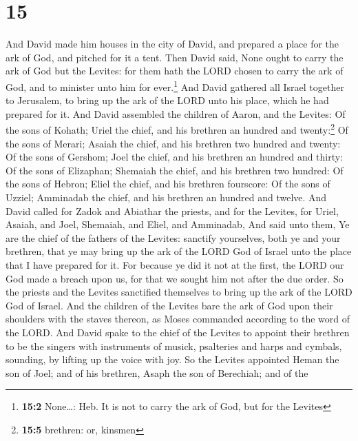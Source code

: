 \hypertarget{section-14}{%
\section{15}\label{section-14}}

 And David made him houses in the city of David, and
prepared a place for the ark of God, and pitched for it a tent.
 Then David said, None ought to carry the ark of God but
the Levites: for them hath the LORD chosen to carry the ark of God, and
to minister unto him for ever.\footnote{\textbf{15:2} None\ldots: Heb.
  It is not to carry the ark of God, but for the Levites} 
And David gathered all Israel together to Jerusalem, to bring up the ark
of the LORD unto his place, which he had prepared for it. 
And David assembled the children of Aaron, and the Levites:
 Of the sons of Kohath; Uriel the chief, and his brethren
an hundred and twenty:\footnote{\textbf{15:5} brethren: or, kinsmen}
 Of the sons of Merari; Asaiah the chief, and his brethren
two hundred and twenty:  Of the sons of Gershom; Joel the
chief, and his brethren an hundred and thirty:  Of the
sons of Elizaphan; Shemaiah the chief, and his brethren two hundred:
 Of the sons of Hebron; Eliel the chief, and his brethren
fourscore:  Of the sons of Uzziel; Amminadab the chief,
and his brethren an hundred and twelve.  And David called
for Zadok and Abiathar the priests, and for the Levites, for Uriel,
Asaiah, and Joel, Shemaiah, and Eliel, and Amminadab, 
And said unto them, Ye are the chief of the fathers of the Levites:
sanctify yourselves, both ye and your brethren, that ye may bring up the
ark of the LORD God of Israel unto the place that I have prepared for
it.  For because ye did it not at the first, the LORD our
God made a breach upon us, for that we sought him not after the due
order.  So the priests and the Levites sanctified
themselves to bring up the ark of the LORD God of Israel.
 And the children of the Levites bare the ark of God upon
their shoulders with the staves thereon, as Moses commanded according to
the word of the LORD.  And David spake to the chief of
the Levites to appoint their brethren to be the singers with instruments
of musick, psalteries and harps and cymbals, sounding, by lifting up the
voice with joy.  So the Levites appointed Heman the son
of Joel; and of his brethren, Asaph the son of Berechiah; and of the
